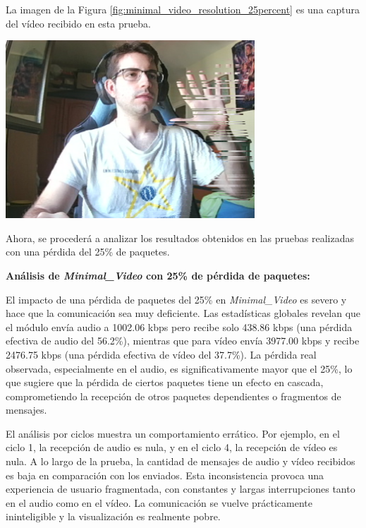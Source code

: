 \newpage

La imagen de la Figura \ref{fig:minimal_video_resolution_25percent} es una captura del vídeo recibido en esta prueba.
\begin{center}
  \includegraphics[width = 0.7\textwidth]{images/VideoRecibido8.3.png}
  \label{fig:minimal_video_resolution_25percent}
\end{center}

\newpage

Ahora, se procederá a analizar los resultados obtenidos en las pruebas realizadas con una pérdida del 25\% de paquetes.
\vspace{\baselineskip}

\textbf{Análisis de \textit{Minimal\_Video} con 25\% de pérdida de paquetes:}
\vspace{\baselineskip}

El impacto de una pérdida de paquetes del 25\% en \textit{Minimal\_Video} es severo y hace que la comunicación sea muy deficiente. Las estadísticas globales revelan que el módulo envía audio a 1002.06 kbps pero recibe solo 438.86 kbps (una pérdida efectiva de audio del 56.2\%), mientras que para vídeo envía 3977.00 kbps y recibe 2476.75 kbps (una pérdida efectiva de vídeo del 37.7\%). La pérdida real observada, especialmente en el audio, es significativamente mayor que el 25\%, lo que sugiere que la pérdida de ciertos paquetes tiene un efecto en cascada, comprometiendo la recepción de otros paquetes dependientes o fragmentos de mensajes.
\vspace{\baselineskip}

El análisis por ciclos muestra un comportamiento errático. Por ejemplo, en el ciclo 1, la recepción de audio es nula, y en el ciclo 4, la recepción de vídeo es nula. A lo largo de la prueba, la cantidad de mensajes de audio y vídeo recibidos es baja en comparación con los enviados. Esta inconsistencia provoca una experiencia de usuario fragmentada, con constantes y largas interrupciones tanto en el audio como en el vídeo. La comunicación se vuelve prácticamente ininteligible y la visualización es realmente pobre.

